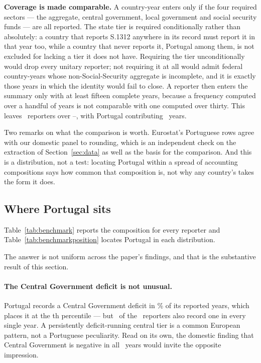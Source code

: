\textbf{Coverage is made comparable.} A country-year enters only if the four required
sectors --- the aggregate, central government, local government and social security funds
--- are all reported. The state tier is required conditionally rather than absolutely: a
country that reports S.1312 anywhere in its record must report it in that year too, while
a country that never reports it, Portugal among them, is not excluded for lacking a tier
it does not have. Requiring the tier unconditionally would drop every unitary reporter;
not requiring it at all would admit federal country-years whose non-Social-Security
aggregate is incomplete, and it is exactly those years in which the identity would fail
to close. A reporter then enters the summary only with at least fifteen complete years,
because a frequency computed over a handful of years is not comparable with one computed
over thirty. This leaves \BenchmarkCountries\ reporters over
\BenchmarkStart--\BenchmarkEnd, with Portugal contributing \BenchmarkYears\ years.

Two remarks on what the comparison is worth. Eurostat's Portuguese rows agree with our
domestic panel to rounding, which is an independent check on the extraction of
Section~\ref{sec:data} as well as the basis for the comparison. And this is a
distribution, not a test: locating Portugal within a spread of accounting compositions
says how common that composition is, not why any country's takes the form it does.

\subsection{Where Portugal sits}

Table~\ref{tab:benchmark} reports the composition for every reporter and
Table~\ref{tab:benchmarkposition} locates Portugal in each distribution.




The answer is not uniform across the paper's findings, and that is the substantive
result of this section.

\paragraph{The Central Government deficit is not unusual.} Portugal records a Central
Government deficit in \PtCentralNegativeShare\% of its reported years, which places it
at the \PtCentralPercentile th percentile --- but \CentralAlwaysNegativeCountries\ of
the \BenchmarkCountries\ reporters also record one in every single year. A persistently
deficit-running central tier is a common European pattern, not a Portuguese
peculiarity. Read on its own, the domestic finding that Central Government is negative
in all \CentralNegativeYears\ years would invite the opposite impression.

